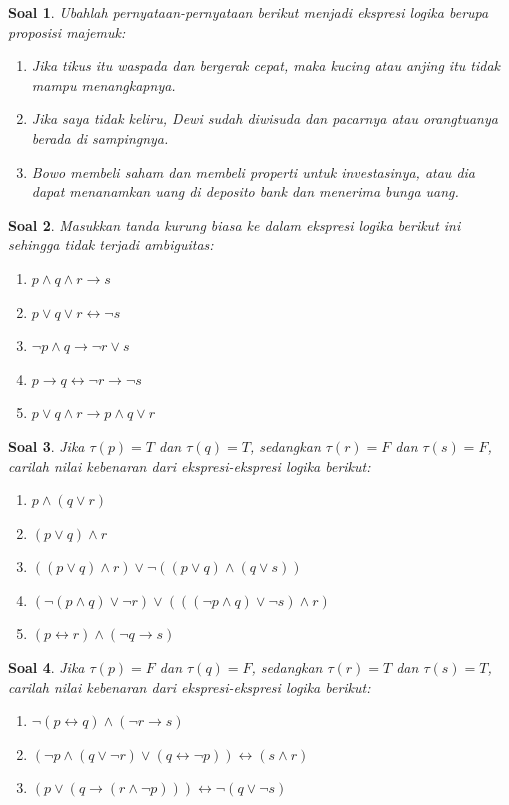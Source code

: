 \documentclass[12pt,a4paper]{article}
\theoremstyle{soaljarak}
\newtheorem{soal}{Soal}
\begin{document}
\begin{soal}
  Ubahlah pernyataan-pernyataan berikut menjadi ekspresi logika berupa proposisi majemuk:
  \begin{enumerate}
    \item Jika tikus itu waspada dan bergerak cepat, maka kucing atau anjing itu tidak mampu menangkapnya.
    \item Jika saya tidak keliru, Dewi sudah diwisuda dan pacarnya atau orangtuanya berada di sampingnya.
    \item Bowo membeli saham dan membeli properti untuk investasinya, atau dia dapat menanamkan uang di deposito bank dan menerima bunga uang.
  \end{enumerate}
\end{soal}

\begin{soal}
  Masukkan tanda kurung biasa ke dalam ekspresi logika berikut ini sehingga tidak terjadi ambiguitas:
  \begin{enumerate}
    \item $p \wedge q \wedge r \rightarrow s$
    \item $p \vee q \vee r \leftrightarrow \neg s$
    \item $\neg p \wedge q \rightarrow \neg r \vee s$
    \item $p \rightarrow q \leftrightarrow \neg r \rightarrow \neg s$
    \item $p \vee q \wedge r \rightarrow p \wedge q \vee r$
  \end{enumerate}
\end{soal}

\begin{soal}
  Jika $\tau(p)=T$ dan $\tau(q)=T$, sedangkan $\tau(r)=F$ dan $\tau(s)=F$, carilah nilai kebenaran dari ekspresi-ekspresi logika berikut:
  \begin{enumerate}
    \item $p \wedge (q \vee r)$
    \item $(p \vee q) \wedge r$
    \item $((p\vee q)\wedge r) \vee \neg((p \vee q)\wedge (q\vee s))$
    \item $(\neg(p \wedge q)\vee \neg r) \vee (((\neg p \wedge q)\vee \neg s) \wedge r)$
    \item $(p \leftrightarrow r) \wedge (\neg q \rightarrow s)$
  \end{enumerate}
\end{soal}

\begin{soal}
  Jika $\tau(p)=F$ dan $\tau(q)=F$, sedangkan $\tau(r)=T$ dan $\tau(s)=T$, carilah nilai kebenaran dari ekspresi-ekspresi logika berikut:
  \begin{enumerate}
    \item $\neg(p \leftrightarrow q)\wedge (\neg r \rightarrow s)$
    \item $(\neg p \wedge (q \vee \neg r)\vee (q \leftrightarrow \neg p)) \leftrightarrow (s \wedge r)$
    \item $(p \vee (q \rightarrow (r \wedge \neg p))) \leftrightarrow \neg (q \vee \neg s)$
  \end{enumerate}
\end{soal}
\end{document}
